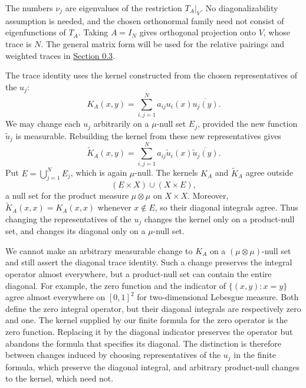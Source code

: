 The numbers $\nu_j$ are eigenvalues of the restriction $T_A|_V$. No diagonalizability assumption is needed, and the chosen orthonormal family need not consist of eigenfunctions of $T_A$. Taking $A=I_N$ gives orthogonal projection onto $V$, whose trace is $N$. The general matrix form will be used for the relative pairings and weighted traces in \hyperref[v1a-ch00-s5]{Section 0.3}.

\begin{remark}\label{kernel-diagonal-representatives}

The trace identity uses the kernel constructed from the chosen representatives of the $u_j$:
\[
K_A(x,y)=\sum_{i,j=1}^N a_{ij}u_i(x)\overline{u_j(y)}.
\]
We may change each $u_j$ arbitrarily on a $\mu$-null set $E_j$, provided the new function $\widetilde u_j$ is measurable. Rebuilding the kernel from these new representatives gives
\[
\widetilde K_A(x,y)=\sum_{i,j=1}^N a_{ij}\widetilde u_i(x)\overline{\widetilde u_j(y)}.
\]
Put $E=\bigcup_{j=1}^N E_j$, which is again $\mu$-null. The kernels $K_A$ and $\widetilde K_A$ agree outside
\[
(E\times X)\cup(X\times E),
\]
a null set for the product measure $\mu\otimes\mu$ on $X\times X$. Moreover, $\widetilde K_A(x,x)=K_A(x,x)$ whenever $x\notin E$, so their diagonal integrals agree. Thus changing the representatives of the $u_j$ changes the kernel only on a product-null set, and changes its diagonal only on a $\mu$-null set.

We cannot make an arbitrary measurable change to $K_A$ on a $(\mu\otimes\mu)$-null set and still assert the diagonal trace identity. Such a change preserves the integral operator almost everywhere, but a product-null set can contain the entire diagonal. For example, the zero function and the indicator of $\{(x,y):x=y\}$ agree almost everywhere on $[0,1]^2$ for two-dimensional Lebesgue measure. Both define the zero integral operator, but their diagonal integrals are respectively zero and one. The kernel supplied by our finite formula for the zero operator is the zero function. Replacing it by the diagonal indicator preserves the operator but abandons the formula that specifies its diagonal. The distinction is therefore between changes induced by choosing representatives of the $u_j$ in the finite formula, which preserve the diagonal integral, and arbitrary product-null changes to the kernel, which need not.
\end{remark}
